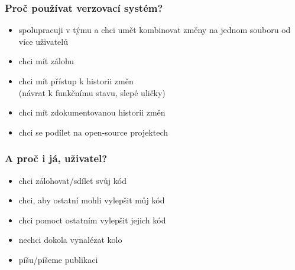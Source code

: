 \documentclass[10pt, xcolor=dvipsnames]{beamer} %
\newcommand{\figpath}{../graphics/}
\begin{document}
%   
%         
%     

\begin{frame}
  \frametitle{Proč používat verzovací systém?}
  
  \begin{itemize}
    \setlength\itemsep{10pt}
    \item spolupracuji v týmu a chci umět kombinovat změny na jednom souboru od více uživatelů
    \item chci mít zálohu
    \item chci mít přístup k historii změn\\ (návrat k funkčnímu stavu, slepé uličky)
    \item chci mít zdokumentovanou historii změn
    \item chci se podílet na open-source projektech
  \end{itemize}
  
  \vspace{0.5cm}
  
\end{frame}


\begin{frame}
  \frametitle{A proč i já, uživatel?}
  
  \vspace{10pt}
  \begin{itemize}
    \setlength\itemsep{10pt}
    \item chci zálohovat/sdílet svůj kód
    \item chci, aby ostatní mohli vylepšit můj kód
    \item chci pomoct ostatním vylepšit jejich kód
    \item nechci dokola vynalézat kolo
    \item píšu/píšeme publikaci
  \end{itemize}
\end{frame}
\end{document}
